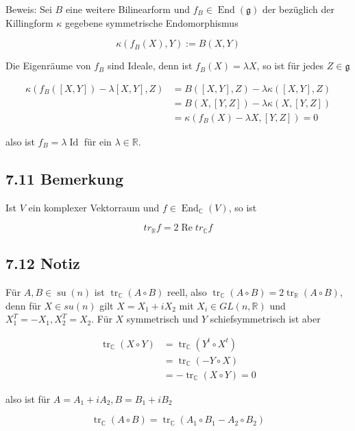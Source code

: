 \documentclass[10pt, letterpaper]{article}
\begin{document}
Beweis: Sei $B$ eine weitere Bilinearform und $f_{B} \in \operatorname{End}(\mathfrak{g})$ der bezüglich der Killingform $\kappa$ gegebene symmetrische Endomorphismus

$$
\kappa\left(f_{B}(X), Y\right):=B(X, Y)
$$

Die Eigenräume von $f_{B}$ sind Ideale, denn ist $f_{B}(X)=\lambda X$, so ist für jedes $Z \in \mathfrak{g}$

$$
\begin{aligned}
\kappa\left(f_{B}([X, Y])-\lambda[X, Y], Z\right) & =B([X, Y], Z)-\lambda \kappa([X, Y], Z) \\
& =B(X,[Y, Z])-\lambda \kappa(X,[Y, Z]) \\
& =\kappa\left(f_{B}(X)-\lambda X,[Y, Z]\right)=0
\end{aligned}
$$

also ist $f_{B}=\lambda \operatorname{Id}$ für ein $\lambda \in \mathbb{R}$.

\subsection*{7.11 Bemerkung}
Ist $V$ ein komplexer Vektorraum und $f \in \operatorname{End}_{\mathbb{C}}(V)$, so ist

$$
t r_{\mathbb{R}} f=2 \operatorname{Re} t r_{\mathbb{C}} f
$$

\subsection*{7.12 Notiz}
Für $A, B \in \operatorname{su}(n)$ ist $\operatorname{tr}_{\mathbb{C}}(A \circ B)$ reell, also $\operatorname{tr}_{\mathbb{C}}(A \circ B)=2 \operatorname{tr}_{\mathbb{R}}(A \circ B)$, denn für $X \in s u(n)$ gilt $X=X_{1}+i X_{2}$ mit $X_{i} \in G L(n, \mathbb{R})$ und $X_{1}^{T}=-X_{1}, X_{2}^{T}=X_{2}$. Für $X$ symmetrisch und $Y$ schiefsymmetrisch ist aber

$$
\begin{aligned}
\operatorname{tr}_{\mathbb{C}}(X \circ Y) & =\operatorname{tr}_{\mathbb{C}}\left(Y^{t} \circ X^{t}\right) \\
& =\operatorname{tr}_{\mathbb{C}}(-Y \circ X) \\
& =-\operatorname{tr}_{\mathbb{C}}(X \circ Y)=0
\end{aligned}
$$

also ist für $A=A_{1}+i A_{2}, B=B_{1}+i B_{2}$

$$
\operatorname{tr}_{\mathbb{C}}(A \circ B)=\operatorname{tr}_{\mathbb{C}}\left(A_{1} \circ B_{1}-A_{2} \circ B_{2}\right)
$$
\end{document}
